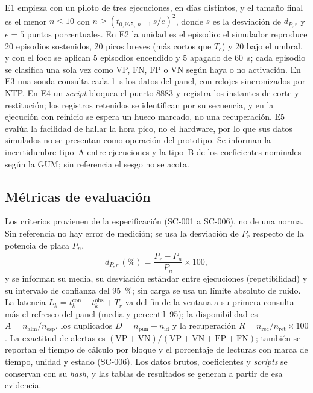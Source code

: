 E1 empieza con un piloto de tres ejecuciones, en días distintos, y el tamaño final es el menor $n\leq10$ con $n\geq(t_{0{,}975,\,n-1}\,s/e)^{2}$, donde $s$ es la desviación de $d_{P,r}$ y $e=5$ puntos porcentuales.
En E2 la unidad es el episodio: el simulador reproduce 20 episodios sostenidos, 20 picos breves (más cortos que $T_c$) y 20 bajo el umbral, y con el foco se aplican 5 episodios encendido y 5 apagado de \SI{60}{s}; cada episodio se clasifica una sola vez como VP, FN, FP o VN según haya o no activación.
En E3 una sonda consulta cada \SI{1}{s} los datos del panel, con relojes sincronizados por NTP.
En E4 un \textit{script} bloquea el puerto 8883 y registra los instantes de corte y restitución; los registros retenidos se identifican por su secuencia, y en la ejecución con reinicio se espera un hueco marcado, no una recuperación.
E5 evalúa la facilidad de hallar la hora pico, no el hardware, por lo que sus datos simulados no se presentan como operación del prototipo.
Se informan la incertidumbre tipo~A entre ejecuciones y la tipo~B de los coeficientes nominales según la GUM; sin referencia el sesgo no se acota.

\subsection{Métricas de evaluación}
\label{sec:metrics}
Los criterios provienen de la especificación (SC-001 a SC-006), no de una norma.
Sin referencia no hay error de medición; se usa la desviación de $\bar{P}_r$ respecto de la potencia de placa $P_n$,
\begin{equation}
d_{P,r}\,(\%)=\frac{\bar{P}_r-P_n}{P_n}\times100,
\label{eq:error}
\end{equation}
y se informan su media, su desviación estándar entre ejecuciones (repetibilidad) y su intervalo de confianza del \SI{95}{\percent}; sin carga se usa un límite absoluto de ruido.
La latencia $L_k=t_k^{\mathrm{con}}-t_k^{\mathrm{obs}}+T_r$ va del fin de la ventana a su primera consulta más el refresco del panel (media y percentil~95); la disponibilidad es $A=n_{\mathrm{alm}}/n_{\mathrm{esp}}$, los duplicados $D=n_{\mathrm{pun}}-n_{\mathrm{id}}$ y la recuperación $R=n_{\mathrm{rec}}/n_{\mathrm{ret}}\times100$.
La exactitud de alertas es $(\mathrm{VP}+\mathrm{VN})/(\mathrm{VP}+\mathrm{VN}+\mathrm{FP}+\mathrm{FN})$; también se reportan el tiempo de cálculo por bloque y el porcentaje de lecturas con marca de tiempo, unidad y estado (SC-006).
Los datos brutos, coeficientes y \textit{scripts} se conservan con su \textit{hash}, y las tablas de resultados se generan a partir de esa evidencia.
